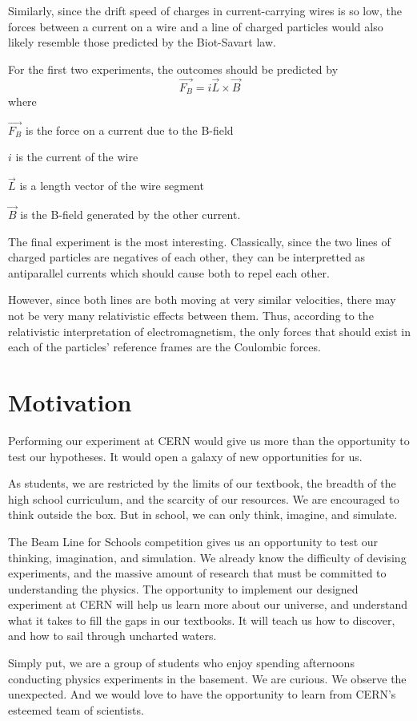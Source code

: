 \documentclass[12pt,letterpaper]{article}
\begin{document}
Similarly, since the drift speed of charges in current-carrying wires is so low, the forces between a current on a wire and a line of charged particles would also likely resemble those predicted by the Biot-Savart law.

For the first two experiments, the outcomes should be predicted by \[ %
	\vec{F_B} = i\vec{L}\times \vec{B}
\]
where
\begin{description}
	\item $\vec{F_B}$ is the force on a current due to the B-field
	\item $i$ is the current of the wire
	\item $\vec{L}$ is a length vector of the wire segment
	\item $\vec{B}$ is the B-field generated by the other current.
\end{description}

The final experiment is the most interesting. Classically, since the two lines of charged particles are negatives of each other, they can be interpretted as antiparallel currents which should cause both to repel each other.

However, since both lines are both moving at very similar velocities, there may not be very many relativistic effects between them. Thus, according to the relativistic interpretation of electromagnetism, the only forces that should exist in each of the particles' reference frames are the Coulombic forces.

\section{Motivation}
Performing our experiment at CERN would give us more than the opportunity to test our hypotheses. It would open a galaxy of new opportunities for us.

As students, we are restricted by the limits of our textbook, the breadth of the high school curriculum, and the scarcity of our resources. We are encouraged to think outside the box. But in school, we can only think, imagine, and simulate.

The Beam Line for Schools competition gives us an opportunity to test our thinking, imagination, and simulation. We already know the difficulty of devising experiments, and the massive amount of research that must be committed to understanding the physics. The opportunity to implement our designed experiment at CERN will help us learn more about our universe, and understand what it takes to fill the gaps in our textbooks.
It will teach us how to discover, and how to sail through uncharted waters.


Simply put, we are a group of students who enjoy spending afternoons conducting physics experiments in the basement. We are curious. We observe the unexpected. And we would love to have the opportunity to learn from CERN’s esteemed team of scientists.
\end{document}
